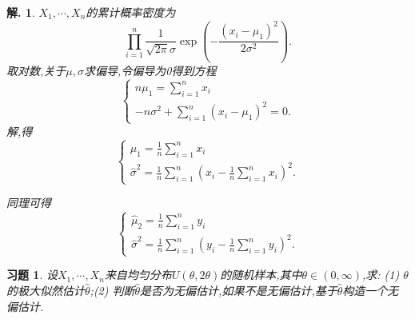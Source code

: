 \documentclass[a4paper,oneside,12pt]{ctexart}
\theoremstyle{plain}
\newtheorem{exercise}{习题}
\theoremstyle{nonumberplain}
\newtheorem{solution}{解.}
\theoremstyle{nonumberplain}
\begin{document}
    \begin{solution}
        $X_1,\cdots,X_n$的累计概率密度为 
        \begin{equation*}
            \prod_{i=1}^n\frac{1}{\sqrt{2\pi}\sigma}\exp\left(-\frac{(x_i-\mu_1)^2}{2\sigma^2}\right).
        \end{equation*}
        取对数,关于$\mu,\sigma$求偏导,令偏导为0得到方程
        \begin{equation*}
            \begin{cases}
                n\mu_1=\sum_{i=1}^nx_i\\
                -n\sigma^2+\sum_{i=1}^n(x_i-\mu_1)^2=0.
            \end{cases}
        \end{equation*}
        解,得 
        \begin{equation*}
            \begin{cases}
                \hat{\mu}_1=\frac{1}{n}\sum_{i=1}^nx_i\\
                \hat{\sigma}^2=\frac{1}{n}\sum_{i=1}^n\left(x_i-\frac{1}{n}\sum_{i=1}^nx_i\right)^2.
            \end{cases}
        \end{equation*}

        同理可得 
        \begin{equation*}
            \begin{cases}
                \hat{\mu}_2=\frac{1}{n}\sum_{i=1}^ny_i\\
                \hat{\sigma}^2=\frac{1}{n}\sum_{i=1}^n\left(y_i-\frac{1}{n}\sum_{i=1}^ny_i\right)^2.
            \end{cases}
        \end{equation*}
    \end{solution}

    \begin{exercise}
        \label{ex:4}
        设$X_1,\cdots,X_n$来自均匀分布$U(\theta,2\theta)$的随机样本,其中$\theta\in(0,\infty)$,求:
        (1) $\theta$的极大似然估计$\hat{\theta}$;(2) 判断$\hat{\theta}$是否为无偏估计,如果不是无偏估计,基于$\hat{\theta}$构造一个无偏估计.
    \end{exercise}
\end{document}

